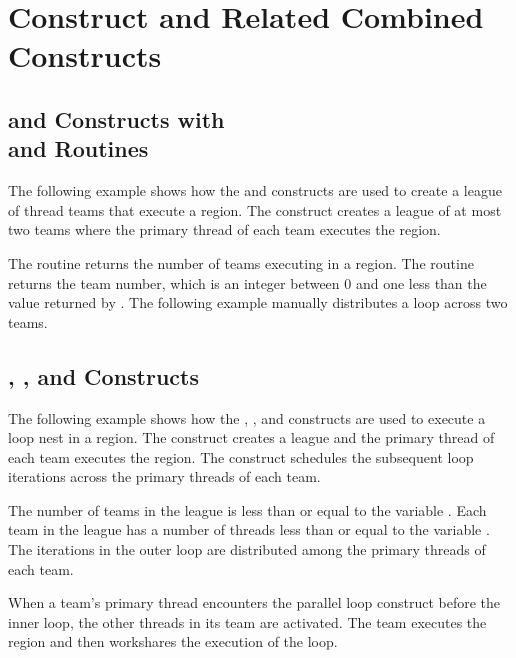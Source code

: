 \pagebreak
\section{ Construct and Related Combined Constructs}
\label{sec:teams}

\subsection{ and  Constructs with \\
and  Routines}
\label{subsec:teams_api}

The following example shows how the  and  constructs 
are used to create a league of thread teams that execute a region. The  
construct creates a league of at most two teams where the primary thread of each 
team executes the  region.

The  routine returns the number of teams executing in a  
region. The  routine returns the team number, which is an integer 
between 0 and one less than the value returned by . The following 
example manually distributes a loop across two teams.



\subsection{, , and  Constructs}
\label{subsec:teams_distribute}

The following example shows how the , , and  
constructs are used to execute a loop nest in a  region. The  
construct creates a league and the primary thread of each team executes the  
region. The  construct schedules the subsequent loop iterations 
across the primary threads of each team.

The number of teams in the league is less than or equal to the variable . 
Each team in the league has a number of threads less than or equal to the variable 
. The iterations in the outer loop are distributed among the primary 
threads of each team.

When a team's primary thread encounters the parallel loop construct before the inner 
loop, the other threads in its team are activated. The team executes the  
region and then workshares the execution of the loop.

